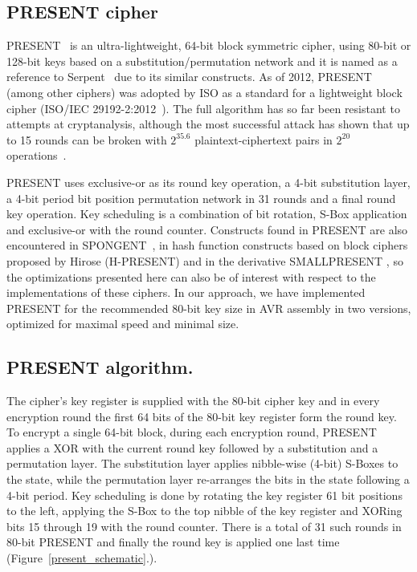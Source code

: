 \documentclass[11pt]{article}
\begin{document}
\subsection{PRESENT cipher}
 PRESENT~\cite{bogdanov2007present} is an ultra-lightweight, 64-bit block symmetric cipher, using 80-bit or 128-bit keys based on a substitution/permutation network and it is named as a reference to Serpent~\cite{anderson1998serpent} due to its similar constructs.
As of 2012, PRESENT (among other ciphers) was adopted by ISO as a standard for a lightweight block cipher (ISO/IEC 29192-2:2012~\cite{present_iso}). The full algorithm has so far been resistant to attempts at cryptanalysis, although the most successful attack has shown that up to 15 rounds can be broken with $2^{35.6}$ plaintext-ciphertext pairs in $2^{20}$ operations~\cite{abed2012biclique,collard2009statistical,nakahara2009linear}.

PRESENT uses exclusive-or as its round key operation, a 4-bit substitution layer, a 4-bit period bit position permutation network in 31 rounds and a final round key operation.
Key scheduling is a combination of bit rotation, S-Box application and exclusive-or with the round counter.
Constructs found in PRESENT are also encountered in SPONGENT~\cite{bogdanov2011spongent}, in hash function constructs based on block ciphers proposed by Hirose \cite{bogdanov2008hash,hirose2005provably,hirose2006some} (H-PRESENT) and in the derivative SMALLPRESENT \cite{leander2010small}, so the optimizations presented here can also be of interest with respect to the implementations of these ciphers. In our approach, we have implemented PRESENT for the recommended 80-bit key size in AVR assembly in two versions, optimized for maximal speed and minimal size.
\subsection{PRESENT algorithm.}
The cipher's key register is supplied with the 80-bit cipher key and in every encryption round the first 64 bits of the 80-bit key register form the round key.
To encrypt a single 64-bit block, during each encryption round, PRESENT applies a XOR with the current round key followed by a substitution and a permutation layer.
The substitution layer applies nibble-wise (4-bit) S-Boxes to the state, while the permutation layer re-arranges the bits in the state following a 4-bit period.
Key scheduling is done by rotating the key register 61 bit positions to the left, applying the S-Box to the top nibble of the key register and XORing bits 15 through 19 with the round counter.
There is a total of 31 such rounds in 80-bit PRESENT and finally the round key is applied one last time 
(Figure~\ref{present_schematic}.).
\end{document}
